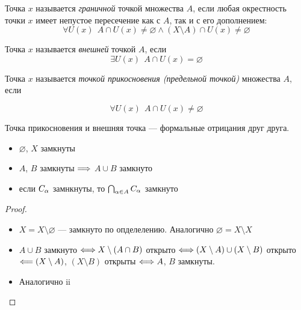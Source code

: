 \begin{definition}
    Точка $x$ называется \textit{граничной} точкой множества $A$, если любая окрестность
    точки $x$ имеет непустое пересечение как с $A$, так и с его дополнением:
\[
    \forall U(x)~~ A \cap U(x) \neq \varnothing \wedge (X \setminus A) \cap U(x)
    \neq \varnothing
\]
\end{definition}

\begin{definition}
    Точка $x$ называется \textit{внешней} точкой $A$, если
\[
    \exists U(x)~~ A \cap U(x) = \varnothing
\]
\end{definition}

\begin{definition}
	Точка $x$ называется \textit{точкой прикосновения (предельной точкой)}
	множества $A$, если
\end{definition}
\[
    \forall U(x)~~ A \cap U(x) \neq \varnothing
\]

\begin{remark}
    Точка прикосновения и внешняя точка --- формальные отрицания друг друга.
\end{remark}

\begin{theorem}
    \enewline
    \begin{itemize}
        \item $\varnothing$, $X$ замкнуты
        \item $A$, $B$ замкнуты $\Longrightarrow$ $A \cup B$ замкнуто
        \item если $C_\alpha$ замнкнуты, то $\bigcap_{\alpha \in A}{C_\alpha}$ замкнуто
    \end{itemize}
\end{theorem}
\begin{proof}
    \enewline
    \begin{itemize}
        \item $X = X \setminus \varnothing$ --- замкнуто по опделелению.
        Аналогично $\varnothing = X \setminus X$
        \item $A \cup B$ замкнуто $\Longleftrightarrow X \setminus (A \cap B)$ открыто
        $\Longleftrightarrow (X \setminus A) \cup (X \setminus B)$ открыто $\Longleftarrow (X \setminus
        A)$, $(X \setminus B)$ открыты $\Longleftrightarrow A$, $B$ замкнуты.
        \item Аналогично ii
    \end{itemize}
\end{proof}

